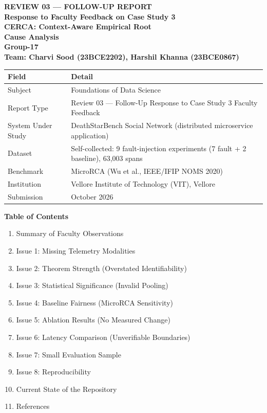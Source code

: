 \documentclass[11pt,a4paper]{article}
\newcommand{\tb}[1]{\textbf{#1}}
\begin{document}
\thispagestyle{empty}

\begin{center}
  {\fontsize{22}{26}\selectfont\bfseries REVIEW 03 --- FOLLOW-UP REPORT}\\[10pt]
  {\fontsize{18}{22}\selectfont\bfseries Response to Faculty Feedback on Case Study 3}\\[10pt]
  {\fontsize{18}{22}\selectfont\bfseries CERCA: Context-Aware Empirical Root\\ Cause Analysis}\\[14pt]
  {\small\bfseries Group-17}\\[6pt]
  {\small\bfseries Team: Charvi Sood (23BCE2202), Harshil Khanna (23BCE0867)}
\end{center}

\vspace{6pt}

\noindent
\begin{tabular}{|L{3.0cm}|L{12.4cm}|}
\hline
\tb{Field} & \tb{Detail} \\ \hline
Subject & Foundations of Data Science \\ \hline
Report Type & Review 03 --- Follow-Up Response to Case Study 3 Faculty Feedback \\ \hline
System Under Study & DeathStarBench Social Network (distributed microservice application) \\ \hline
Dataset & Self-collected: 9 fault-injection experiments (7 fault + 2 baseline), 63,003 spans \\ \hline
Benchmark & MicroRCA (Wu et al., IEEE/IFIP NOMS 2020) \\ \hline
Institution & Vellore Institute of Technology (VIT), Vellore \\ \hline
Submission & October 2026 \\ \hline
\end{tabular}

\vspace{14pt}

\textbf{\small Table of Contents}
\begin{enumerate}[leftmargin=2.2em,itemsep=2pt,topsep=4pt,label=\arabic*.]\small
  \item Summary of Faculty Observations
  \item Issue 1: Missing Telemetry Modalities
  \item Issue 2: Theorem Strength (Overstated Identifiability)
  \item Issue 3: Statistical Significance (Invalid Pooling)
  \item Issue 4: Baseline Fairness (MicroRCA Sensitivity)
  \item Issue 5: Ablation Results (No Measured Change)
  \item Issue 6: Latency Comparison (Unverifiable Boundaries)
  \item Issue 7: Small Evaluation Sample
  \item Issue 8: Reproducibility
  \item Current State of the Repository
  \item References
\end{enumerate}
\end{document}
